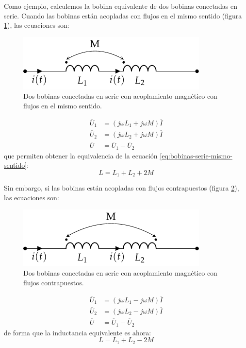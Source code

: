 Como ejemplo, calculemos la bobina equivalente de dos bobinas
conectadas en serie. Cuando las bobinas están acopladas con flujos en
el mismo sentido (figura \ref{fig:bobinas-serie-mismo-sentido}), las
ecuaciones son:

\begin{figure}
  \centering
  \includegraphics[height=0.1\textheight]{../figs/bobinas_serie.pdf}
  \caption{Dos bobinas conectadas en serie con acoplamiento magnético
    con flujos en el mismo sentido.}
  \label{fig:bobinas-serie-mismo-sentido}
\end{figure}

  \begin{align*}
    \overline{U}_1 &= (j \omega L_1 + j \omega M) \overline{I}\\
    \overline{U}_2 &= (j \omega L_2 + j \omega M) \overline{I}\\
    \overline{U} &= \overline{U}_1 + \overline{U}_2 
  \end{align*}
  que permiten obtener la equivalencia de la ecuación
  \ref{eq:bobinas-serie-mismo-sentido}:
  \begin{equation}
    \label{eq:bobinas-serie-mismo-sentido}
    L = L_1 + L_2 + 2M
  \end{equation}

  Sin embargo, si las bobinas están acopladas con flujos contrapuestos
  (figura \ref{fig:bobinas-serie-flujo-contrapuesto}), las ecuaciones
  son:
  \begin{figure}
    \centering
    \includegraphics[height=0.1\textheight]{../figs/bobinas_serie_opuesto.pdf}
    \caption{Dos bobinas conectadas en serie con acoplamiento
      magnético con flujos contrapuestos.}
    \label{fig:bobinas-serie-flujo-contrapuesto}
  \end{figure}

\begin{align*}
  \overline{U}_1 &= (j \omega L_1 - j \omega M) \overline{I}\\
  \overline{U}_2 &= (j \omega L_2 - j \omega M) \overline{I}\\
  \overline{U} &= \overline{U}_1 + \overline{U}_2 
\end{align*}
de forma que la inductancia equivalente es ahora:
\begin{equation}
  \label{eq:bobinas-serie-contrapuesto}
  L = L_1 + L_2 - 2M
\end{equation}

